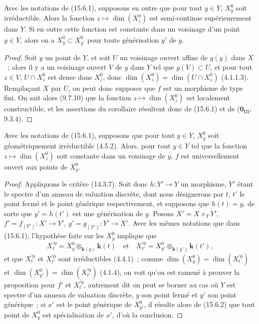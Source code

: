 \begin{corollary}[15.6.2]
\label{IV.15.6.2-fr}
Avec les notations de (15.6.1), supposons en outre que pour tout $y\in Y$, $X_y^0$ soit irréductible. Alors la fonction $z\mapsto\dim(X_z^0)$ est semi-continue supérieurement dans $Y$. Si en outre cette fonction est constante dans un voisinage d'un point $y\in Y$, alors on a $X_y^0\subset\overline{X_{y'}^0}$ pour toute générisation $y'$ de $y$.
\end{corollary}

\begin{proof}
Soit $y$ un point de $Y$, et soit $U$ un voisinage ouvert affine de $g(y)$ dans $X$~; alors il y a un voisinage ouvert $V$ de $y$ dans $Y$ tel que $g(V)\subset U$, et pour tout $z\in V$, $U\cap X_z^0$ est dense dans $X_z^0$, donc $\dim(X_z^0)=\dim(U\cap X_z^0)$ (4.1.1.3). Remplaçant $X$ par $U$, on peut donc supposer que $f$ est un morphisme de type fini. On sait alors (9.7.10) que la fonction $z\mapsto\dim(X_z^0)$ est localement constructible, et les assertions du corollaire résultent donc de (15.6.1) et de ($\mathbf{0}_{\mathrm{III}}$, 9.3.4).
\end{proof}

\begin{proposition}[15.6.3]
\label{IV.15.6.3-fr}
Avec les notations de (15.6.1), supposons que pour tout $y\in Y$, $X_y^0$ soit géométriquement irréductible (4.5.2). Alors, pour tout $y\in Y$ tel que la fonction $z\mapsto\dim(X_z^0)$ soit constante dans un voisinage de $y$, $f$ est universellement ouvert aux points de $X_y^0$.
\end{proposition}

\begin{proof}
Appliquons le critère (14.3.7). Soit donc $h:Y'\to Y$ un morphisme, $Y'$ étant le spectre d'un anneau de valuation discrète, dont nous désignerons par $t$, $t'$ le point fermé et le point générique respectivement, et supposons que $h(t)=y$, de sorte que $y'=h(t')$ est une générisation de $y$. Posons $X'=X\times_Y Y'$, $f'=f_{(Y')}:X'\to Y'$, $g'=g_{(Y')}:Y'\to X'$. Avec les mêmes notations que dans (15.6.1), l'hypothèse faite sur les $X_y^0$ implique que
\[
  X_t^{\prime 0}=X_y^0\otimes_{\mathbf{k}(y)}\mathbf{k}(t)
  \quad\text{et}\quad
  X_{t'}^{\prime 0}=X_{y'}^0\otimes_{\mathbf{k}(y')}\mathbf{k}(t'),
\]
et que $X_t^{\prime 0}$ et $X_{t'}^{\prime 0}$ sont irréductibles (4.4.1)~; comme $\dim(X_y^0)=\dim(X_t^{\prime 0})$ et $\dim(X_{y'}^0)=\dim(X_{t'}^{\prime 0})$ (4.1.4), on voit qu'on est ramené à prouver la proposition pour $f'$ et $X_t^{\prime 0}$, autrement dit on peut se borner au cas où $Y$ est spectre d'un anneau de valuation discrète, $y$ son point fermé et $y'$ son point générique~; si $x'$ est le point générique de $X_{y'}^0$, il résulte alors de (15.6.2) que tout point de $X_y^0$ est spécialisation de $x'$, d'où la conclusion.
\end{proof}

